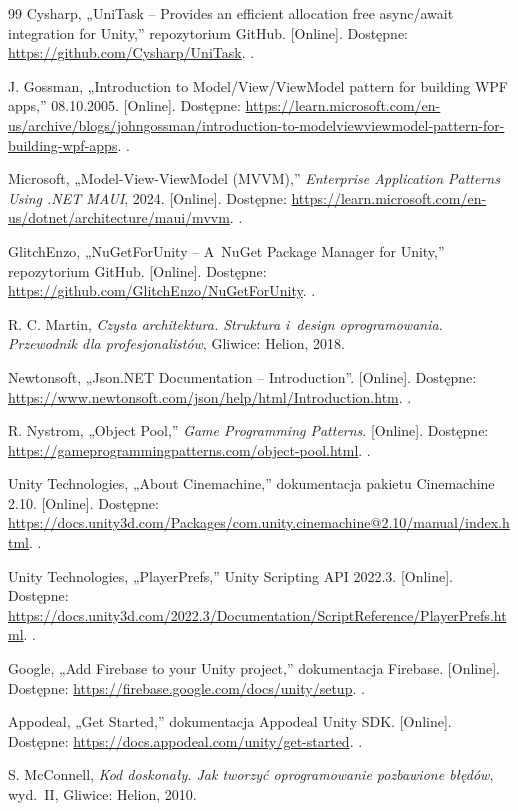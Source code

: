 \begin{thebibliography}{99}
 Cysharp, „UniTask -- Provides an efficient allocation free async/await
  integration for Unity,” repozytorium GitHub. [Online]. Dostępne:
  \url{https://github.com/Cysharp/UniTask}. \dostep.

 J. Gossman, „Introduction to Model/View/ViewModel pattern for building
  WPF apps,” 08.10.2005. [Online]. Dostępne:
  \url{https://learn.microsoft.com/en-us/archive/blogs/johngossman/introduction-to-modelviewviewmodel-pattern-for-building-wpf-apps}.
  \dostep.

 Microsoft, „Model-View-ViewModel (MVVM),” \emph{Enterprise Application
  Patterns Using .NET MAUI}, 2024. [Online]. Dostępne:
  \url{https://learn.microsoft.com/en-us/dotnet/architecture/maui/mvvm}. \dostep.

 GlitchEnzo, „NuGetForUnity -- A~NuGet Package Manager for Unity,”
  repozytorium GitHub. [Online]. Dostępne:
  \url{https://github.com/GlitchEnzo/NuGetForUnity}. \dostep.

 R. C. Martin, \emph{Czysta architektura. Struktura i~design
  oprogramowania. Przewodnik dla profesjonalistów}, Gliwice: Helion, 2018.

 Newtonsoft, „Json.NET Documentation -- Introduction”. [Online].
  Dostępne: \url{https://www.newtonsoft.com/json/help/html/Introduction.htm}. \dostep.

 R. Nystrom, „Object Pool,” \emph{Game Programming Patterns}.
  [Online]. Dostępne: \url{https://gameprogrammingpatterns.com/object-pool.html}. \dostep.

 Unity Technologies, „About Cinemachine,” dokumentacja pakietu
  Cinemachine 2.10. [Online]. Dostępne:
  \url{https://docs.unity3d.com/Packages/com.unity.cinemachine@2.10/manual/index.html}.
  \dostep.

 Unity Technologies, „PlayerPrefs,” Unity Scripting API
  2022.3. [Online]. Dostępne:
  \url{https://docs.unity3d.com/2022.3/Documentation/ScriptReference/PlayerPrefs.html}.
  \dostep.

 Google, „Add Firebase to your Unity project,” dokumentacja
  Firebase. [Online]. Dostępne: \url{https://firebase.google.com/docs/unity/setup}. \dostep.

 Appodeal, „Get Started,” dokumentacja Appodeal Unity SDK. [Online].
  Dostępne: \url{https://docs.appodeal.com/unity/get-started}. \dostep.

 S. McConnell, \emph{Kod doskonały. Jak tworzyć oprogramowanie
  pozbawione błędów}, wyd.~II, Gliwice: Helion, 2010.

\end{thebibliography}
\endgroup
